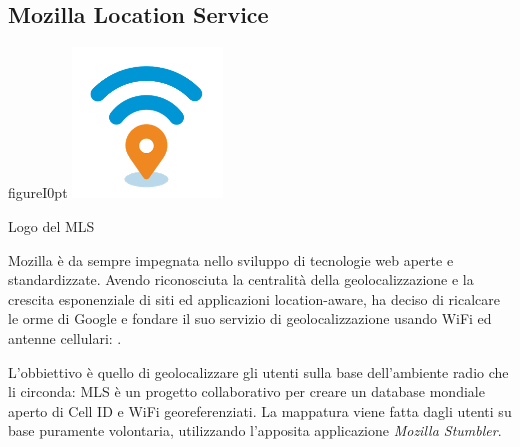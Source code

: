 \subsection{Mozilla Location Service}
\begin{wrapfloat}{figure}{I}{0pt}
	\centering
	\includegraphics[width=0.3\textwidth]{./Immagini/Dati/MLSlogo.png}
	\caption{Logo del MLS}
\end{wrapfloat}
Mozilla è da sempre impegnata nello sviluppo di tecnologie web aperte e standardizzate. Avendo riconosciuta la centralità della geolocalizzazione e la crescita esponenziale di siti ed applicazioni location-aware, ha deciso di ricalcare le orme di Google e fondare il suo servizio di geolocalizzazione usando WiFi ed antenne cellulari: .


L'obbiettivo è quello di geolocalizzare gli utenti sulla base dell'ambiente radio che li circonda: MLS è un progetto collaborativo per creare un database mondiale aperto di Cell ID e WiFi georeferenziati. La mappatura viene fatta dagli utenti su base puramente volontaria, utilizzando l'apposita applicazione \emph{Mozilla Stumbler}.

